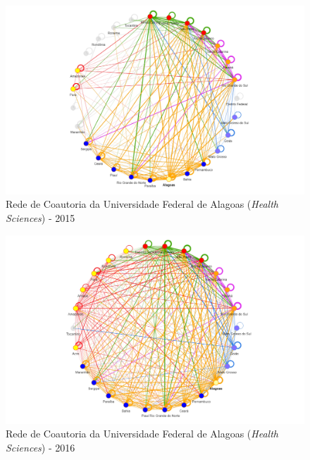 \begin{figure}[H]
	\centering
	\includegraphics[scale=0.6]{Imagens/rede-al-2015.pdf}
	\caption{Rede de Coautoria da Universidade Federal de Alagoas (\textit{Health Sciences}) - 2015}
	\label{Rede de Coautoria - UF AL 2015}
\end{figure}

\begin{figure}[H]
	\centering
	\includegraphics[scale=0.6]{Imagens/rede-al-2016.pdf}
	\caption{Rede de Coautoria da Universidade Federal de Alagoas (\textit{Health Sciences}) - 2016}
	\label{Rede de Coautoria - UF AL 2016}
\end{figure}


